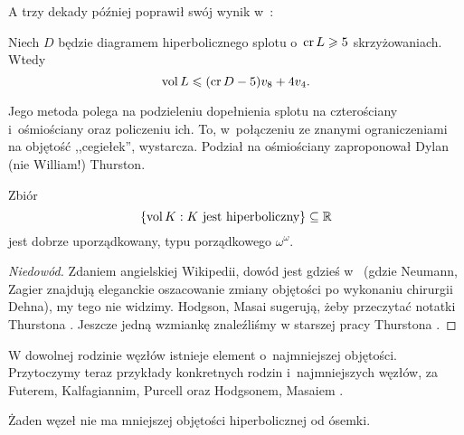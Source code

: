 A trzy dekady później poprawił swój wynik w~\cite{adams13}:

\begin{proposition}
    Niech $D$ będzie diagramem hiperbolicznego splotu o~$\operatorname{cr} L \geqslant 5$ skrzyżowaniach.
    Wtedy
    \begin{equation}
        \operatorname{vol} L \leqslant (\operatorname{cr} D - 5) v_8 + 4v_4.
    \end{equation}
\end{proposition}

Jego metoda polega na podzieleniu dopełnienia splotu na czterościany i~ośmiościany oraz policzeniu ich.
To, w~połączeniu ze znanymi ograniczeniami na objętość ,,cegiełek'', wystarcza.
Podział na ośmiościany zaproponował Dylan (nie William!) Thurston.
%

\begin{proposition}
    Zbiór
    \[
        \{\operatorname{vol} K: K \textrm{ jest hiperboliczny}\} \subseteq \mathbb R
    \]
    jest dobrze uporządkowany, typu porządkowego $\omega^\omega$.
\end{proposition}

\begin{proof}[Niedowód]
    Zdaniem angielskiej Wikipedii, dowód jest gdzieś w~\cite{neumann85} (gdzie Neumann, Zagier znajdują eleganckie oszacowanie zmiany objętości po wykonaniu chirurgii Dehna), my tego nie widzimy.
%
%
    Hodgson, Masai \cite{hodgson13} sugerują, żeby przeczytać notatki Thurstona \cite{thurston02}.
%
%
    Jeszcze jedną wzmiankę znaleźliśmy w starszej pracy Thurstona \cite[s. 365]{thurston82}.
\end{proof}

W dowolnej rodzinie węzłów istnieje element o~najmniejszej objętości.
Przytoczymy teraz przykłady konkretnych rodzin i~najmniejszych węzłów, za Futerem, Kalfagiannim, Purcell \cite[s. 16-17]{purcell19} oraz Hodgsonem, Masaiem \cite[s. 296]{hodgson13}.
%
%
%
%
%

\begin{proposition}
%
%
\label{prp:eight_smallest_volume}%
    Żaden węzeł nie ma mniejszej objętości hiperbolicznej od ósemki.
\end{proposition}

